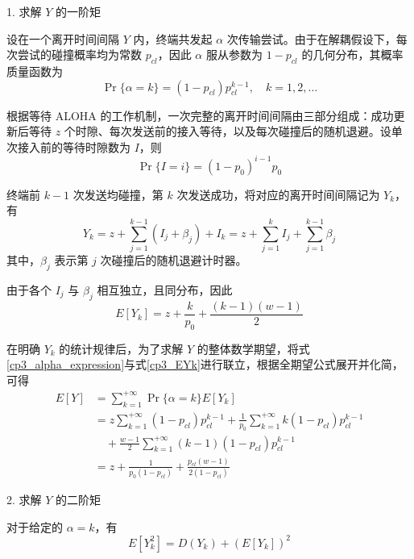 1. 求解 $Y$ 的一阶矩

    设在一个离开时间间隔 $Y$ 内，终端共发起 $\alpha$ 次传输尝试。由于在解耦假设下，每次尝试的碰撞概率均为常数 $p_{cl}$，因此 $\alpha$ 服从参数为 $1-p_{cl}$ 的几何分布，其概率质量函数为
    \begin{equation}\label{cp3_alpha_expression}
        \Pr\{\alpha=k\}=(1-p_{cl})p_{cl}^{k-1},\quad k=1,2,\dots
    \end{equation}

    根据等待 ALOHA 的工作机制，一次完整的离开时间间隔由三部分组成：成功更新后等待 $z$ 个时隙、每次发送前的接入等待，以及每次碰撞后的随机退避。设单次接入前的等待时隙数为 $I$，则
    \begin{equation}\label{cp3_I_expression}
        \Pr\{I=i\}=(1-p_0)^{i-1}p_0
    \end{equation}

    终端前 $k-1$ 次发送均碰撞，第 $k$ 次发送成功，将对应的离开时间间隔记为 $Y_k$，有
    \begin{equation}\label{cp3_Yk_expression}
        Y_k=z+\sum_{j=1}^{k-1}(I_j+\beta_j)+I_k
        =z+\sum_{j=1}^{k}I_j+\sum_{j=1}^{k-1}\beta_j
    \end{equation}
    其中，$\beta_j$ 表示第 $j$ 次碰撞后的随机退避计时器。

    由于各个 $I_j$ 与 $\beta_j$ 相互独立，且同分布，因此
    \begin{equation}\label{cp3_EYk}
        E[Y_k]=z+\frac{k}{p_0}+\frac{(k-1)(w-1)}{2}
    \end{equation}

    在明确 $Y_k$ 的统计规律后，为了求解 $Y$ 的整体数学期望，将式\eqref{cp3_alpha_expression}与式\eqref{cp3_EYk}进行联立，根据全期望公式展开并化简，可得
    \begin{equation}\label{cp3_EY}
        \begin{split}
            E[Y] &= \sum_{k=1}^{+\infty}\Pr\{\alpha=k\}E[Y_k] \\
            &= z\sum_{k=1}^{+\infty}(1-p_{cl})p_{cl}^{k-1} + \frac{1}{p_0}\sum_{k=1}^{+\infty}k(1-p_{cl})p_{cl}^{k-1} \\
            &\quad + \frac{w-1}{2}\sum_{k=1}^{+\infty}(k-1)(1-p_{cl})p_{cl}^{k-1} \\
            &= z + \frac{1}{p_0(1-p_{cl})} + \frac{p_{cl}(w-1)}{2(1-p_{cl})}
        \end{split}
    \end{equation}

2. 求解 $Y$ 的二阶矩

    对于给定的 $\alpha=k$，有
    \begin{equation}\label{cp3_EYk^2}
        E[Y_k^2] = D(Y_k) + (E[Y_k])^2
    \end{equation}

